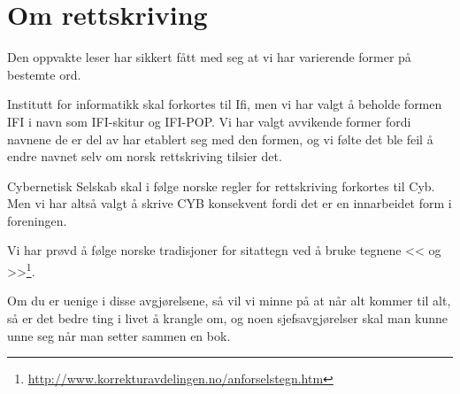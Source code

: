 \chapter*{Om rettskriving}

Den oppvakte leser har sikkert fått med seg at vi har varierende former på bestemte ord.

Institutt for informatikk skal forkortes til Ifi, men vi har valgt å beholde formen IFI i navn som IFI-skitur og IFI-POP. Vi har valgt avvikende former fordi navnene de er del av har etablert seg med den formen, og vi følte det ble feil å endre navnet selv om norsk rettskriving tilsier det. 

Cybernetisk Selskab skal i følge norske regler for rettskriving forkortes til Cyb. Men vi har altså valgt å skrive CYB konsekvent fordi det er en innarbeidet form i foreningen.

Vi har prøvd å følge norske tradisjoner for sitattegn ved å bruke tegnene << og >>\footnote{\url{http://www.korrekturavdelingen.no/anforselstegn.htm}}.

Om du er uenige i disse avgjørelsene, så vil vi minne på at når alt kommer til alt, så er det bedre ting i livet å krangle om, og noen sjefsavgjørelser skal man kunne unne seg når man setter sammen en bok.
